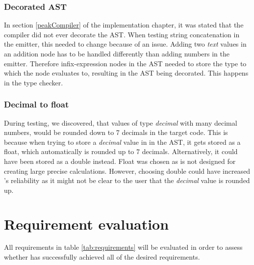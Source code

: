 \subsubsection{Decorated AST}
In section \ref{peakCompiler} of the implementation chapter, it was stated that the \lang compiler did not ever decorate the AST. When testing string concatenation in the emitter, this needed to change because of an issue. Adding two \textit{text} values in an addition node has to be handled differently than adding numbers in the emitter. Therefore infix-expression nodes in the AST needed to store the type to which the node evaluates to, resulting in the AST being decorated. This happens in the type checker. 

\subsubsection{Decimal to float}
During testing, we discovered, that values of type \textit{decimal} with many decimal numbers, would be rounded down to 7 decimals in the target code. This is because when trying to store a \textit{decimal} value in \lang in the AST, it gets stored as a float, which automatically is rounded up to 7 decimals. Alternatively, it could have been stored as a double instead. Float was chosen as \lang is not designed for creating large precise calculations. However, choosing double could have increased \lang's reliability as it might not be clear to the user that the \textit{decimal} value is rounded up.\\

\newpage
\section{Requirement evaluation} %
All requirements in table \ref{tab:requirements} will be evaluated in order to assess whether \lang has successfully achieved all of the desired requirements. 

